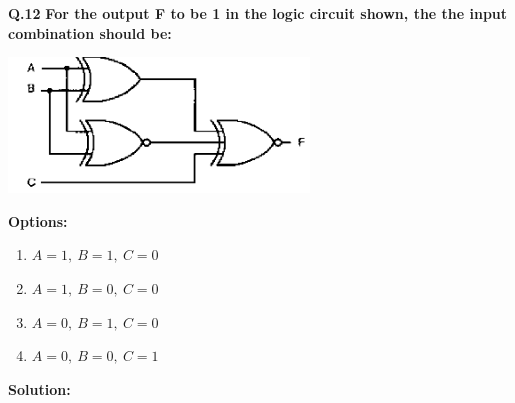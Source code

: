 \documentclass[12pt]{article}
\begin{document}
\noindent\textbf{Q.12} \textbf{For the output F to be 1 in the logic circuit shown, the  the input combination should be:}

\vspace{1em}
\begin{center}
    \includegraphics[width=0.6\textwidth]{circuit.png}
\end{center}
\vspace{1em}

\noindent\textbf{Options:}
\begin{multicols}{2}
\begin{enumerate}[label=(\Alph*)]
    \item \( A = 1,\ B = 1,\ C = 0 \)
    \item \( A = 1,\ B = 0,\ C = 0 \)
    \item \( A = 0,\ B = 1,\ C = 0 \)
    \item \( A = 0,\ B = 0,\ C = 1 \)
\end{enumerate}
\end{multicols}
\vspace{1em}
\noindent\textbf{Solution:}
\end{document}
